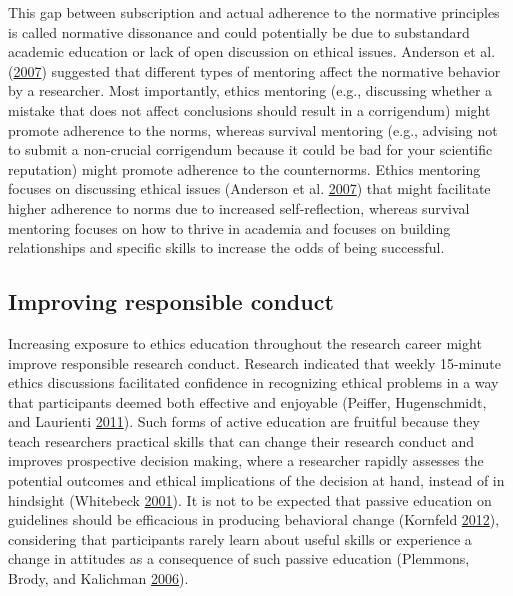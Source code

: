 \documentclass[a5paper]{book}
\begin{document}
This gap between subscription and actual adherence to the normative
principles is called normative dissonance and could potentially be due
to substandard academic education or lack of open discussion on ethical
issues. Anderson et al.
(\protect\hyperlink{ref-doi:10.1097ux2fACM.0b013e31812f764c}{2007})
suggested that different types of mentoring affect the normative
behavior by a researcher. Most importantly, ethics mentoring (e.g.,
discussing whether a mistake that does not affect conclusions should
result in a corrigendum) might promote adherence to the norms, whereas
survival mentoring (e.g., advising not to submit a non-crucial
corrigendum because it could be bad for your scientific reputation)
might promote adherence to the counternorms. Ethics mentoring focuses on
discussing ethical issues (Anderson et al.
\protect\hyperlink{ref-doi:10.1097ux2fACM.0b013e31812f764c}{2007}) that
might facilitate higher adherence to norms due to increased
self-reflection, whereas survival mentoring focuses on how to thrive in
academia and focuses on building relationships and specific skills to
increase the odds of being successful.

\hypertarget{improving-responsible-conduct}{\subsection{Improving
responsible conduct}\label{improving-responsible-conduct}}

Increasing exposure to ethics education throughout the research career
might improve responsible research conduct. Research indicated that
weekly 15-minute ethics discussions facilitated confidence in
recognizing ethical problems in a way that participants deemed both
effective and enjoyable (Peiffer, Hugenschmidt, and Laurienti
\protect\hyperlink{ref-doi:10.1007ux2fs11948-010-9197-3}{2011}). Such
forms of active education are fruitful because they teach researchers
practical skills that can change their research conduct and improves
prospective decision making, where a researcher rapidly assesses the
potential outcomes and ethical implications of the decision at hand,
instead of in hindsight (Whitebeck
\protect\hyperlink{ref-doi:10.1007ux2fs11948-001-0012-z}{2001}). It is
not to be expected that passive education on guidelines should be
efficacious in producing behavioral change (Kornfeld
\protect\hyperlink{ref-doi:10.1097ux2fACM.0b013e318257ee6a}{2012}),
considering that participants rarely learn about useful skills or
experience a change in attitudes as a consequence of such passive
education (Plemmons, Brody, and Kalichman
\protect\hyperlink{ref-doi:10.1007ux2fs11948-006-0055-2}{2006}).
\end{document}
